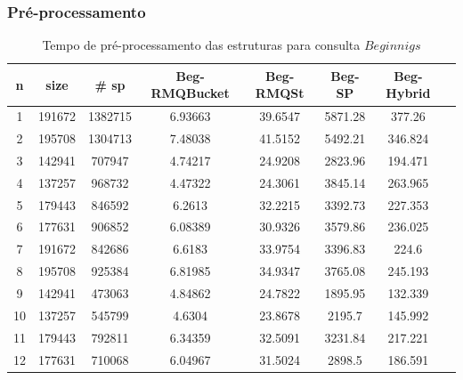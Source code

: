 \documentclass[dissertacao, brazil]{ThesisPUC}
\begin{document}
\subsubsection{Pré-processamento}

\begin{table}
\small
\begin{center}
\begin{tabular}{|c|c|c|c|c|c|c|c|}
\hline
\textbf{n} & \textbf{size} & \textbf{\# sp} & \textbf{Beg-RMQBucket} & \textbf{Beg-RMQSt} & \textbf{Beg-SP} & \textbf{Beg-Hybrid}\\
\hline
1 &  191672 & 1382715 & 6.93663 & 39.6547 & 5871.28 & 377.26\\
\hline
2 & 195708 & 1304713 & 7.48038 & 41.5152 & 5492.21 & 346.824\\
\hline
3 & 142941 & 707947 & 4.74217 & 24.9208 & 2823.96 & 194.471\\
\hline
4 & 137257 & 968732 & 4.47322 & 24.3061 & 3845.14 & 263.965\\
\hline
5 & 179443 & 846592 & 6.2613 & 32.2215 & 3392.73 & 227.353\\
\hline
6 & 177631 & 906852 & 6.08389 & 30.9326 & 3579.86 & 236.025\\
\hline
7 & 191672 & 842686 & 6.6183 & 33.9754 & 3396.83 & 224.6\\
\hline
8 & 195708 & 925384 & 6.81985 & 34.9347 & 3765.08 & 245.193\\
\hline
9 & 142941 & 473063 & 4.84862 & 24.7822 & 1895.95 & 132.339\\
\hline
10 & 137257 & 545799 & 4.6304 & 23.8678 & 2195.7 & 145.992\\
\hline
11 & 179443 & 792811 & 6.34359 & 32.5091 & 3231.84 & 217.221\\
\hline
12 & 177631 & 710068 & 6.04967 & 31.5024 & 2898.5 & 186.591\\
\hline
\end{tabular}
\end{center}
\label{tab:beg_pre_series}
\caption{Tempo de pré-processamento das estruturas para consulta $Beginnigs$}
\end{table}





\appendix
\end{document}
